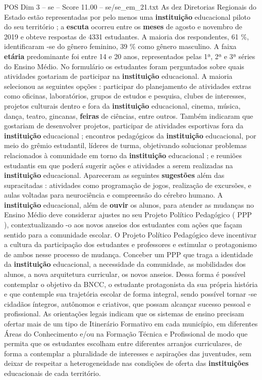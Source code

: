 \begin{textsample}{POS Dim 3 – se – Score 11.00 – se/se\_em\_21.txt}
As dez Diretorias Regionais do Estado estão representadas por pelo menos uma \textbf{instituição} educacional piloto do seu território ; a \textbf{escuta} ocorreu entre os \textbf{meses} de agosto e novembro de 2019 e obteve respostas de 4331 estudantes.
A maioria dos respondentes, 61 \%, identificaram -se do gênero feminino, 39 \% como gênero masculino.
A faixa \textbf{etária} predominante foi entre 14 e 20 anos, representados pelas 1ª, 2ª e 3ª séries do Ensino Médio.
No formulário os estudantes foram perguntados sobre quais atividades gostariam de participar na \textbf{instituição} educacional.
A maioria selecionou as seguintes opções : participar do planejamento de atividades extras como oficinas, laboratórios, grupos de estudos e pesquisa, clubes de interesses, projetos culturais dentro e fora da \textbf{instituição} educacional, cinema, música, dança, teatro, gincanas, \textbf{feiras} de ciências, entre outros.
Também indicaram que gostariam de desenvolver projetos, participar de atividades esportivas fora da \textbf{instituição} educacional ; encontros pedagógicos da \textbf{instituição} educacional, por meio do grêmio estudantil, líderes de turma, objetivando solucionar problemas relacionados à comunidade em torno da \textbf{instituição} educacional ; e reuniões estudantis em que poderá sugerir ações e atividades a serem realizadas na \textbf{instituição} educacional.
Apareceram as seguintes \textbf{sugestões} além das supracitadas : atividades como programação de jogos, realização de excursões, e aulas voltadas para neurociência e compreensão do cérebro humano.
A \textbf{instituição} educacional, além de \textbf{ouvir} os alunos, para atender as mudanças no Ensino Médio deve considerar ajustes no seu Projeto Político Pedagógico ( PPP ), contextualizando -o aos novos anseios dos estudantes com ações que façam sentido para a comunidade escolar.
O Projeto Político Pedagógico deve incentivar a cultura da participação dos estudantes e professores e estimular o protagonismo de ambos nesse processo de mudança.
Conceber um PPP que traga a identidade da \textbf{instituição} educacional, a necessidade da comunidade, as mobilidades dos alunos, a nova arquitetura curricular, os novos anseios.
Dessa forma é possível contemplar o objetivo da BNCC, o estudante protagonista da sua própria história e que contemple sua trajetória escolar de forma integral, sendo possível tornar -se cidadãos íntegros, autônomos e criativos, que possam alcançar sucesso pessoal e profissional.
As orientações legais indicam que os sistemas de ensino precisam ofertar mais de um tipo de Itinerário Formativo em cada município, em diferentes Áreas do Conhecimento e/ou na Formação Técnica e Profissional de modo que permita que os estudantes escolham entre diferentes arranjos curriculares, de forma a contemplar a pluralidade de interesses e aspirações das juventudes, sem deixar de respeitar a heterogeneidade nas condições de oferta das \textbf{instituições} educacionais de cada território.

\end{textsample}
